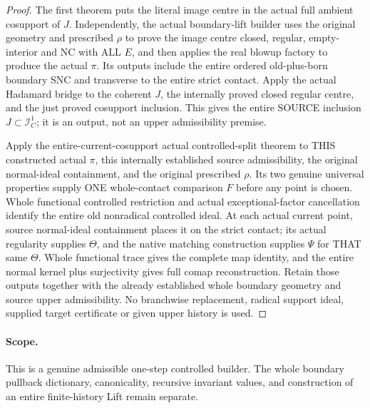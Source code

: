 \begin{proof}
The first theorem puts the literal image centre in the actual full ambient
cosupport of $J$. Independently, the actual boundary-lift builder uses the
original geometry and prescribed $\rho$ to prove the image centre closed,
regular, empty-interior and NC with ALL $E$, and then applies the real blowup
factory to produce the actual $\pi$. Its outputs include the entire ordered
old-plus-born boundary SNC and transverse to the entire strict contact.
Apply the actual Hadamard bridge to the coherent $J$, the internally proved
closed regular centre, and the just proved cosupport inclusion. This gives
the entire SOURCE inclusion $J\subset\mathcal I_C^1$; it is an output, not
an upper admissibility premise.

Apply the entire-current-cosupport actual controlled-split theorem to THIS
constructed actual $\pi$, this internally established source admissibility,
the original normal-ideal containment, and the original prescribed $\rho$.
Its two genuine universal properties supply ONE whole-contact comparison
$F$ before any point is chosen. Whole functional controlled restriction and
actual exceptional-factor cancellation identify the entire old nonradical
controlled ideal. At each actual current point, source normal-ideal
containment places it on the strict contact; its actual regularity supplies
$\Theta$, and the native matching construction supplies $\Psi$ for THAT same
$\Theta$. Whole functional trace gives the complete map identity, and the
entire normal kernel plus surjectivity gives full comap reconstruction.
Retain those outputs together with the already established whole boundary
geometry and source upper admissibility. No branchwise replacement, radical
support ideal, supplied target certificate or given upper history is used.
\end{proof}

\paragraph{Scope.} This is a genuine admissible one-step controlled builder.
The whole boundary pullback dictionary, canonicality, recursive invariant
values, and construction of an entire finite-history Lift remain separate.
